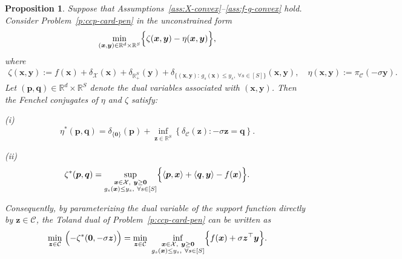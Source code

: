 \documentclass[11pt]{article}
\newtheorem{proposition}[theorem]{Proposition}
\def\bs{\boldsymbol}
\def\Re{\mathbb{R}}
\def\C{\mathcal{C}}
\def\X{\mathcal{X}}
\begin{document}
\begin{proposition}\label{prop:ts-dual-card-pen}
Suppose that Assumptions~\ref{ass:X-convex}--\ref{ass:f-g-convex} hold.
Consider Problem~\eqref{p:ccp-card-pen} in the unconstrained form
\[
\min_{(\bs{x},\bs{y})\in\Re^d\times\Re^S}
\Bigl\{\zeta(\bs{x},\bs{y})-\eta(\bs{x},\bs{y})\Bigr\},
\]
where
\begin{align*}
\zeta(\bs{x},\bs{y})
:= f(\bs{x})
+\delta_{\X}(\bs{x})
+\delta_{\Re^S_+}(\bs{y})
+\delta_{\{(\bs{x},\bs{y}):\, g_s(\bs{x})\le y_s,\ \forall s\in[S]\}}(\bs{x},\bs{y}), \quad \eta(\bs{x},\bs{y})
:= \pi_{\C}(-\sigma \bs{y}).
\end{align*}
Let $(\bs{p},\bs{q})\in\Re^d\times\Re^S$ denote the dual variables associated with $(\bs{x},\bs{y})$. Then the Fenchel conjugates of $\eta$ and $\zeta$ satisfy:

\smallskip
\noindent\textnormal{(i)}
\[
\eta^*(\bs{p},\bs{q})
=
\delta_{\{\bs{0}\}}(\bs{p})
+
\inf_{\bs{z}\in\Re^S}\left\{
\delta_{\C}(\bs{z}) : -\sigma \bs{z}=\bs{q}
\right\}.
\]

\smallskip
\noindent\textnormal{(ii)}
\[
\zeta^*(\bs{p},\bs{q})
=
\sup_{\substack{\bs{x}\in\X,\ \bs{y}\ge\bs{0}\\ g_s(\bs{x})\le y_s,\ \forall s\in[S]}}
\Bigl\{
\langle \bs{p},\bs{x}\rangle+\langle \bs{q},\bs{y}\rangle-f(\bs{x})
\Bigr\}.
\]

\smallskip
Consequently, by parameterizing the dual variable of the support function directly by $\bs{z}\in\C$, the Toland dual of Problem~\eqref{p:ccp-card-pen} can be written as
\begin{equation}\label{eq:ts-dual-card-pen}
\min_{\bs{z}\in\C}\ \Bigl(-\zeta^*(\bs{0},-\sigma \bs{z})\Bigr)
=
\min_{\bs{z}\in\C}\ \inf_{\substack{\bs{x}\in\X,\ \bs{y}\ge\bs{0}\\ g_s(\bs{x})\le y_s,\ \forall s\in[S]}}
\Bigl\{
f(\bs{x})+\sigma \bs{z}^\top \bs{y}
\Bigr\}.
\end{equation}
\end{proposition}
\end{document}
